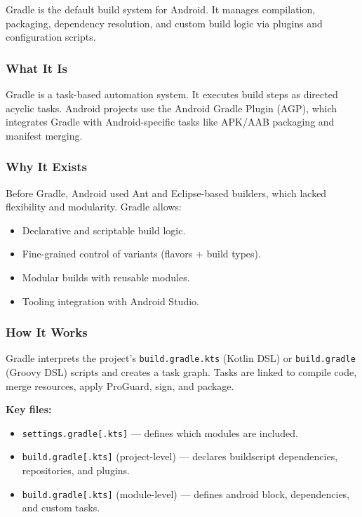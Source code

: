 \documentclass[a4paper,12pt]{article}
\begin{document}
Gradle is the default build system for Android. It manages compilation, packaging, dependency resolution, and custom build logic via plugins and configuration scripts.

\subsubsection{What It Is}

Gradle is a task-based automation system. It executes build steps as directed acyclic tasks. Android projects use the Android Gradle Plugin (AGP), which integrates Gradle with Android-specific tasks like APK/AAB packaging and manifest merging.

\subsubsection{Why It Exists}

Before Gradle, Android used Ant and Eclipse-based builders, which lacked flexibility and modularity. Gradle allows:

\begin{itemize}
  \item Declarative and scriptable build logic.
  \item Fine-grained control of variants (flavors + build types).
  \item Modular builds with reusable modules.
  \item Tooling integration with Android Studio.
\end{itemize}

\subsubsection{How It Works}

Gradle interprets the project's \texttt{build.gradle.kts} (Kotlin DSL) or \texttt{build.gradle} (Groovy DSL) scripts and creates a task graph. Tasks are linked to compile code, merge resources, apply ProGuard, sign, and package.

\textbf{Key files:}
\begin{itemize}
  \item \texttt{settings.gradle[.kts]} — defines which modules are included.
  \item \texttt{build.gradle[.kts]} (project-level) — declares buildscript dependencies, repositories, and plugins.
  \item \texttt{build.gradle[.kts]} (module-level) — defines android block, dependencies, and custom tasks.
\end{itemize}
\end{document}
